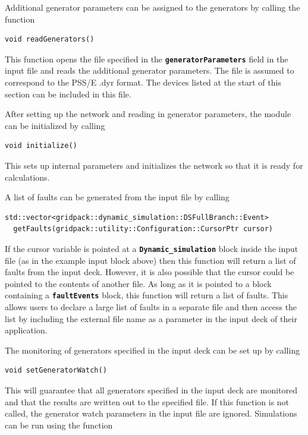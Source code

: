 \documentclass[12pt]{report} %
\begin{document}
Additional generator parameters can be assigned to the generators by calling the function

{
\color{red}
\begin{Verbatim}[fontseries=b]
void readGenerators()
\end{Verbatim}
}

This function opens the file specified in the \texttt{\textbf{generatorParameters}} field in the input file and reads the additional generator parameters. The file is assumed to correspond to the PSS/E .dyr format. The devices listed at the start of this section can be included in this file.

After setting up the network and reading in generator parameters, the module can be initialized by calling

{
\color{red}
\begin{Verbatim}[fontseries=b]
void initialize()
\end{Verbatim}
}

This sets up internal parameters and initializes the network so that it is ready for calculations.

A list of faults can be generated from the input file by calling

{
\color{red}
\begin{Verbatim}[fontseries=b]
std::vector<gridpack::dynamic_simulation::DSFullBranch::Event>
  getFaults(gridpack::utility::Configuration::CursorPtr cursor)
\end{Verbatim}
}

If the cursor variable is pointed at a \texttt{\textbf{Dynamic\_simulation}} block inside the input file (as in the example input block above) then this function will return a list of faults from the input deck. However, it is also possible that the cursor could be pointed to the contents of another file. As long as it is pointed to a block containing a \texttt{\textbf{faultEvents}} block, this function will return a list of faults. This allows users to declare a large list of faults in a separate file and then access the list by including the external file name as a parameter in the input deck of their application.

The monitoring of generators specified in the input deck can be set up by calling

{
\color{red}
\begin{Verbatim}[fontseries=b]
void setGeneratorWatch()
\end{Verbatim}
}

This will guarantee that all generators specified in the input deck are monitored and that the results are written out to the specified file. If this function is not called, the generator watch parameters in the input file are ignored.
Simulations can be run using the function
\end{document}
